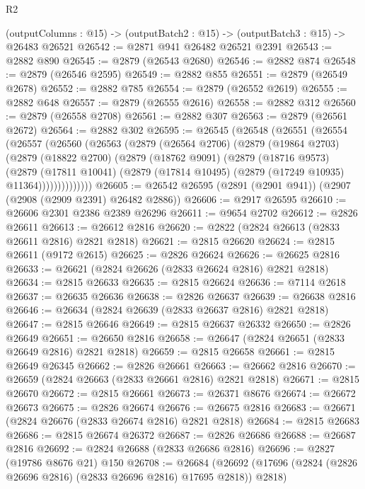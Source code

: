 \begin{lexlean}{R2}
\begin{coremodule}
  (outputColumns : @15) -> (outputBatch2 : @15) -> (outputBatch3 : @15) -> @26483 @26521
@26542 := @2871 @941 @26482 @26521 @2391
@26543 := @2882 @890
@26545 := @2879 (@26543 @2680)
@26546 := @2882 @874
@26548 := @2879 (@26546 @2595)
@26549 := @2882 @855
@26551 := @2879 (@26549 @2678)
@26552 := @2882 @785
@26554 := @2879 (@26552 @2619)
@26555 := @2882 @648
@26557 := @2879 (@26555 @2616)
@26558 := @2882 @312
@26560 := @2879 (@26558 @2708)
@26561 := @2882 @307
@26563 := @2879 (@26561 @2672)
@26564 := @2882 @302
@26595 := @26545
    (@26548
      (@26551
        (@26554
          (@26557
            (@26560
              (@26563
                (@2879
                  (@26564 @2706)
                  (@2879
                    (@19864 @2703)
                    (@2879
                      (@18822 @2700)
                      (@2879
                        (@18762 @9091)
                        (@2879
                          (@18716 @9573)
                          (@2879
                            (@17811 @10041)
                            (@2879 (@17814 @10495) (@2879 (@17249 @10935) @11364))))))))))))))
@26605 := @26542 @26595 (@2891 (@2901 @941)) (@2907 (@2908 (@2909 @2391) @26482 @2886))
@26606 := @2917 @26595
@26610 := @26606 @2301 @2386 @2389 @26296
@26611 := @9654 @2702
@26612 := @2826 @26611
@26613 := @26612 @2816
@26620 := @2822 (@2824 @26613 (@2833 @26611 @2816) @2821 @2818)
@26621 := @2815 @26620
@26624 := @2815 @26611 (@9172 @2615)
@26625 := @2826 @26624
@26626 := @26625 @2816
@26633 := @26621 (@2824 @26626 (@2833 @26624 @2816) @2821 @2818)
@26634 := @2815 @26633
@26635 := @2815 @26624
@26636 := @7114 @2618
@26637 := @26635 @26636
@26638 := @2826 @26637
@26639 := @26638 @2816
@26646 := @26634 (@2824 @26639 (@2833 @26637 @2816) @2821 @2818)
@26647 := @2815 @26646
@26649 := @2815 @26637 @26332
@26650 := @2826 @26649
@26651 := @26650 @2816
@26658 := @26647 (@2824 @26651 (@2833 @26649 @2816) @2821 @2818)
@26659 := @2815 @26658
@26661 := @2815 @26649 @26345
@26662 := @2826 @26661
@26663 := @26662 @2816
@26670 := @26659 (@2824 @26663 (@2833 @26661 @2816) @2821 @2818)
@26671 := @2815 @26670
@26672 := @2815 @26661
@26673 := @26371 @8676
@26674 := @26672 @26673
@26675 := @2826 @26674
@26676 := @26675 @2816
@26683 := @26671 (@2824 @26676 (@2833 @26674 @2816) @2821 @2818)
@26684 := @2815 @26683
@26686 := @2815 @26674 @26372
@26687 := @2826 @26686
@26688 := @26687 @2816
@26692 := @2824 @26688 (@2833 @26686 @2816)
@26696 := @2827 (@19786 @8676 @21) @150
@26708 := @26684
    (@26692 (@17696 (@2824 (@2826 @26696 @2816) (@2833 @26696 @2816) @17695 @2818)) @2818)

\end{coremodule}
\end{lexlean}

